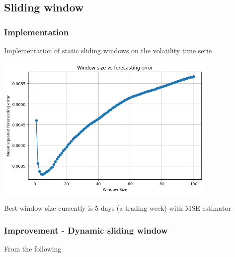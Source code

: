 \documentclass[letterpaper,11pt]{article}
\begin{document}
\subsection*{Sliding window}
\subsubsection*{Implementation}
Implementation of static sliding windows on the volatility time serie 
  \begin{center}
  \includegraphics[width=0.8\textwidth]{img/win_err.png}
  \end{center}
  Best window size currently is 5 days (a trading week) with MSE estimator


\subsubsection*{Improvement - Dynamic sliding window}
From the following 
\end{document}
